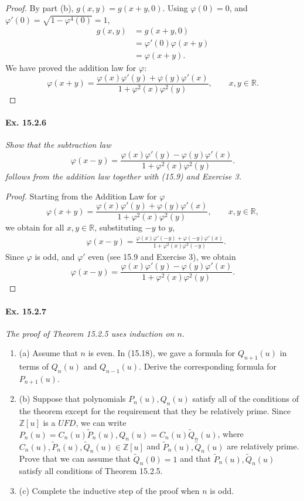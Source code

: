 \documentclass[11pt,a4paper]{article}
\newcommand{\be} {\begin{enumerate}}
\newcommand{\ee} {\end{enumerate}}
\newcommand{\Z}{\mathbb{Z}}
\newcommand{\R}{\mathbb{R}}
\begin{document}
\begin{proof}
By part (b), $g(x,y) =g(x+y,0)$. Using $\varphi(0) = 0$, and $\varphi'(0) = \sqrt{1 - \varphi^4(0)} = 1$, 
\begin{align*}
g(x,y) &=g(x+y,0)\\
&= \varphi'(0) \varphi(x+y)\\
&= \varphi(x+y).
\end{align*}
We have proved the addition law for $\varphi$:
$$\varphi(x+y) = \frac{\varphi(x) \varphi'(y) + \varphi(y) \varphi'(x)}{1 + \varphi^2(x) \varphi^2(y)}, \qquad x,y \in \R.$$
\end{proof}

\paragraph{Ex. 15.2.6}{\it Show that the subtraction law
$$\varphi(x-y) = \frac{\varphi(x) \varphi'(y) - \varphi(y) \varphi'(x)}{1 + \varphi^2(x) \varphi^2(y)}.
$$
follows from the addition law together with (15.9) and Exercise 3.
}

\begin{proof} Starting from the Addition Law for $\varphi$
$$\varphi(x+y) = \frac{\varphi(x) \varphi'(y) + \varphi(y) \varphi'(x)}{1 + \varphi^2(x) \varphi^2(y)}, \qquad x,y \in \R,$$
we obtain for all $x,y \in \R$, substituting $-y$ to $y$,
\begin{align*}
&\varphi(x-y) = \frac{\varphi(x) \varphi'(-y) + \varphi(-y) \varphi'(x)}{1 + \varphi^2(x) \varphi^2(-y)}.
\end{align*}
Since $\varphi$ is odd, and $\varphi'$ even (see 15.9 and Exercise 3), we obtain
$$\varphi(x-y) = \frac{\varphi(x) \varphi'(y) - \varphi(y) \varphi'(x)}{1 + \varphi^2(x) \varphi^2(y)}.
$$
\end{proof}

\paragraph{Ex. 15.2.7}{\it The proof of Theorem 15.2.5 uses induction on $n$.
\be
\item[(a)] Assume that $n$ is even. In (15.18), we gave a formula for $Q_{n+1}(u)$ in terms of $Q_n(u)$ and $Q_{n-1}(u)$. Derive the corresponding formula for $P_{n+1}(u)$.
\item[(b)] Suppose that polynomials $P_n(u),Q_n(u)$ satisfy all of the conditions of the theorem except for the requirement that they be relatively prime. Since $\Z[u]$ is a $UFD$, we can write $P_n(u) = C_n(u)\tilde{P}_n(u), Q_n(u) = C_n(u) \tilde{Q}_n(u)$, where $C_n(u), \tilde P_n(u),\tilde Q_n(u) \in \Z[u]$ and $\tilde P_n(u), \tilde Q_n(u)$ are relatively prime. Prove that we can assume that $\tilde Q_n(0) = 1$ and that $\tilde P_n(u), \tilde Q_n(u)$ satisfy all conditions of Theorem 15.2.5.
\item[(c)] Complete the inductive step of the proof when $n$ is odd.
\ee
}
\end{document}
